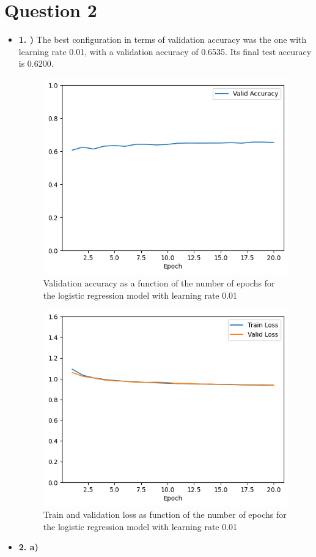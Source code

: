 \documentclass[12pt]{article}
\begin{document}
\section*{Question 2}
\begin{itemize}
    \item \textbf{1. )} The best configuration in terms of validation accuracy was the one with learning rate 0.01, with a validation accuracy of 0.6535. Its final test accuracy is 0.6200.
        \begin{figure}[H]
            \centering
            \includegraphics[width=0.5\linewidth]{../outputs/hw1-q2-1-acc.01.png}
            \caption{Validation accuracy as a function of the number of epochs for the logistic regression model with learning rate 0.01}
            \label{fig:2.1:acc}
        \end{figure}

        \begin{figure}[H]
            \centering
            \includegraphics[width=0.5\linewidth]{../outputs/hw1-q2-1-loss.01.png}
            \caption{Train and validation loss as function of the number of epochs for the logistic regression model with learning rate 0.01}
            \label{fig:2.1:loss}
        \end{figure}

    \item \textbf{2. a)}


\end{itemize}
\end{document}
